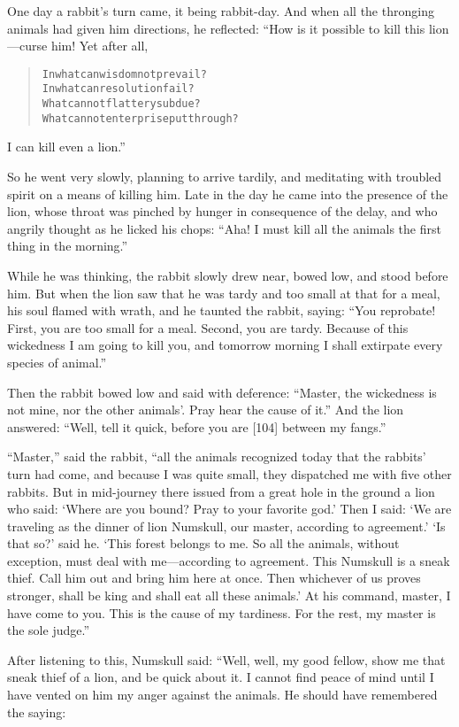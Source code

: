 \documentclass[article, twoside, 14pt]{memoir}
\renewenvironment{verbatim}{%
\begin{quote}%
\vskip -10pt%
\begin{alltt}\normalfont\large}{\end{alltt}%
\end{quote}%
\vskip -10pt
} %
\begin{document}
One day a rabbit's turn came, it being rabbit-day. And when all the
thronging animals had given him directions, he reflected: “How is
it possible to kill this lion---curse him! Yet after all,

\begin{verbatim}
In what can wisdom not prevail?
In what can resolution fail?
What cannot flattery subdue?
What cannot enterprise put through?
\end{verbatim}
I can kill even a lion.”

So he went very slowly, planning to arrive tardily, and meditating
with troubled spirit on a means of killing him. Late in the day he
came into the presence of the lion, whose throat was pinched by
hunger in consequence of the delay, and who angrily thought as he
licked his chops:
``Aha! I must kill all the animals the first thing in the morning.''

While he was thinking, the rabbit slowly drew near, bowed low, and
stood before him. But when the lion saw that he was tardy and too
small at that for a meal, his soul flamed with wrath, and he
taunted the rabbit, saying:
``You reprobate! First, you are too small for a meal. Second, you are tardy. Because of this wickedness I am going to kill you, and tomorrow morning I shall extirpate every species of animal.''

Then the rabbit bowed low and said with deference:
``Master, the wickedness is not mine, nor the other animals'. Pray hear the cause of it.''
And the lion answered:
``Well, tell it quick, before you are [104] between my fangs.''

``Master,'' said the rabbit,
``all the animals recognized today that the rabbits' turn had come, and because I was quite small, they dispatched me with five other rabbits. But in mid-journey there issued from a great hole in the ground a lion who said: `Where are you bound? Pray to your favorite god.' Then I said: `We are traveling as the dinner of lion Numskull, our master, according to agreement.' `Is that so?' said he. `This forest belongs to me. So all the animals, without exception, must deal with me---according to agreement. This Numskull is a sneak thief. Call him out and bring him here at once. Then whichever of us proves stronger, shall be king and shall eat all these animals.' At his command, master, I have come to you. This is the cause of my tardiness. For the rest, my master is the sole judge.''

After listening to this, Numskull said: “Well, well, my good
fellow, show me that sneak thief of a lion, and be quick about it.
I cannot find peace of mind until I have vented on him my anger
against the animals. He should have remembered the saying:
\end{document}
